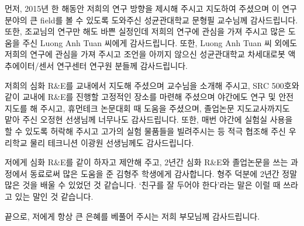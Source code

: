 \clearpage
\begin{onehalfspace} %
	
	
\end{onehalfspace}



\begin{acknowledgements}
먼저, 2015년 한 해동안 저희의 연구 방향을 제시해 주시고 지도하여 주셨으며 이 연구 분야의 큰 field를 볼 수 있도록 도와주신 성균관대학교 문형필 교수님께 감사드립니다. 또한, 조교님의 연구만 해도 바쁜 실정인데 저희의 연구에 관심을 가져 주시고 많은 도움을 주신 Luong Anh Tuan 씨에게 감사드립니다. 또한, Luong Anh Tuan 씨 외에도 저희의 연구에 관심을 가져 주시고 조언을 아끼지 않으신 성균관대학교 차세대로봇 액추에이터/센서 연구센터 연구원 분들께 감사드립니다.

저희의 심화 R\&E를 교내에서 지도해 주셨으며 교수님을 소개해 주시고, SRC 500호와 같이 교내에 R\&E를 진행할 고정적인 장소를 마련해 주셨으며 야간에도 연구 및 안전 지도를 해 주시고, 휴먼테크 논문대회 때 도움을 주셨으며, 졸업논문 지도교사까지도 맡아 주신 오정현 선생님께 너무나도 감사드립니다. 또한, 매번 야간에 실험실 사용을 할 수 있도록 허락해 주시고 고가의 실험 물품들을 빌려주시는 등 적극 협조해 주신 우리학교 물리 테크니션 이광원 선생님께도 감사드립니다.

저에게 심화 R\&E를 같이 하자고 제안해 주고, 2년간 심화 R\&E와 졸업논문을 쓰는 과정에서 동료로써 많은 도움을 준 김형주 학생에게 감사합니다. 형주 덕분에 2년간 정말 많은 것을 배울 수 있었던 것 같습니다. `친구를 잘 두어야 한다'라는 말은 이럴 때 쓰라고 있는 말인 것 같습니다.

끝으로, 저에게 항상 큰 은혜를 베풀어 주시는 저희 부모님께 감사드립니다. 
\end{acknowledgements}

